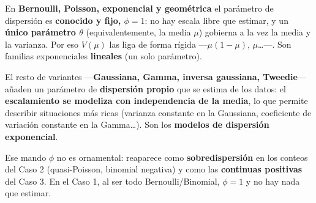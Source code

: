 \documentclass[
  letterpaper,
  DIV=11,
  numbers=noendperiod]{scrartcl}
\begin{document}
\begin{tcolorbox}[enhanced jigsaw, breakable, colframe=quarto-callout-note-color-frame, left=2mm, arc=.35mm, colbacktitle=quarto-callout-note-color!10!white, toprule=.15mm, colback=white, coltitle=black, rightrule=.15mm, opacitybacktitle=0.6, title=\textcolor{quarto-callout-note-color}{\faInfo}\hspace{0.5em}{¿Uno o dos parámetros? El papel de \(\phi\)}, titlerule=0mm, toptitle=1mm, bottomtitle=1mm, leftrule=.75mm, bottomrule=.15mm, opacityback=0]

En \textbf{Bernoulli, Poisson, exponencial y geométrica} el parámetro de
dispersión es \textbf{conocido y fijo, \(\phi=1\)}: no hay escala libre
que estimar, y un \textbf{único parámetro \(\theta\)} (equivalentemente,
la media \(\mu\)) gobierna a la vez la media y la varianza. Por eso
\(V(\mu)\) las liga de forma rígida ---\(\mu(1-\mu)\), \(\mu\)\ldots---.
Son familias exponenciales \textbf{lineales} (un solo parámetro).

El resto de variantes ---\textbf{Gaussiana, Gamma, inversa gaussiana,
Tweedie}--- añaden un parámetro de \textbf{dispersión propio} que se
estima de los datos: el \textbf{escalamiento se modeliza con
independencia de la media}, lo que permite describir situaciones más
ricas (varianza constante en la Gaussiana, coeficiente de variación
constante en la Gamma\ldots). Son los \textbf{modelos de dispersión
exponencial}.

Ese mando \(\phi\) no es ornamental: reaparece como
\textbf{sobredispersión} en los conteos del Caso 2 (quasi-Poisson,
binomial negativa) y como las \textbf{continuas positivas} del Caso 3.
En el Caso 1, al ser todo Bernoulli/Binomial, \(\phi=1\) y no hay nada
que estimar.

\end{tcolorbox}
\end{document}
